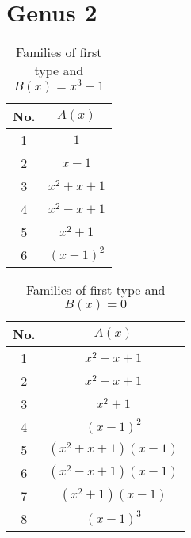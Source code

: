 \documentclass{amsart}
\begin{document}
\section{Genus 2}
\begin{table}[ht]
\caption{Families of first type and $B(x)=x^3+1$}
\centering
\begin{tabular}{|c |c |}
\hline
No. & $A(x)$  \\
\hline
1 & $1$ \\
2 & $x-1$ \\
3 & $x^2+x+1$ \\
4 & $x^2-x+1$ \\
5 & $x^2+1$ \\
6 & $(x-1)^2$ \\
\hline
\end{tabular}
\end{table}

\begin{table}[ht]
\caption{Families of first type and $B(x)=0$}
\centering
\begin{tabular}{|c |c |}
\hline
No. & $A(x)$  \\
\hline
1 & $x^2+x+1$ \\
2 & $x^2-x+1$ \\
3 & $x^2+1$ \\
4 & $(x-1)^2$ \\
5 & $(x^2+x+1)(x-1)$ \\
6 & $(x^2-x+1)(x-1)$ \\
7 & $(x^2+1)(x-1)$ \\
8 & $(x-1)^3$ \\
\hline
\end{tabular}
\end{table}
\end{document}
